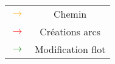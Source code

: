\documentclass[]{article}
\begin{document}
\begin{center}\begin{tabular}{l c}\\
\textcolor{orange}{\LARGE$\rightarrow$} & Chemin \\
 \textcolor{red}{\LARGE$\rightarrow$} & Créations arcs\\
 \textcolor{green}{\LARGE$\rightarrow$} & Modification flot\\
\end{tabular}
\end{center}
\end{document}
